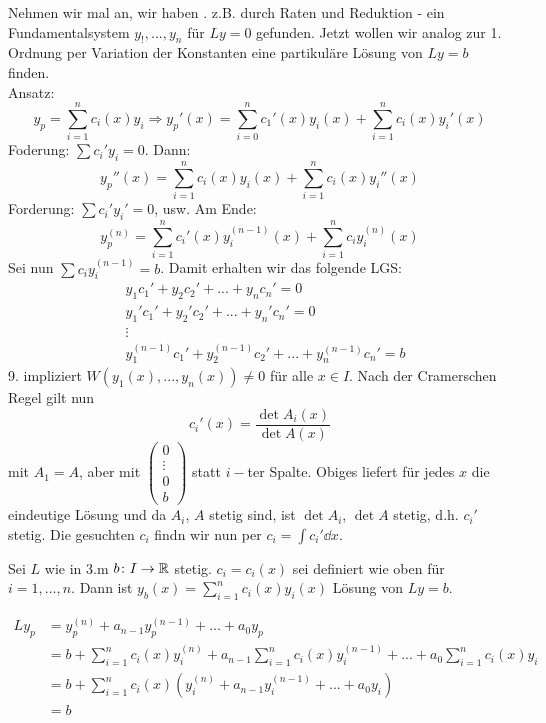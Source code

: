  Nehmen wir mal an, wir haben . z.B. durch Raten und Reduktion -  ein Fundamentalsystem $ y_!,...,y_n $ f\"ur $ Ly=0 $ gefunden. Jetzt wollen wir analog zur 1. Ordnung per Variation der Konstanten eine partikul\"are L\"osung von $ Ly=b $ finden.\\
 Ansatz:
 \[ y_p=\sum_{i=1}^{n}c_i(x)y_i\Rightarrow y_p'(x)=\sum_{i=0}^{n}c_1'(x)y_i(x)+\sum_{i=1}^{n}c_i(x)y_i'(x) \]
 Foderung: $ \sum c_i'y_i=0 $. Dann:
 \[ y_p''(x)=\sum_{i=1}^{n}c_i(x)y_i(x)+\sum_{i=1}^{n}c_i(x)y_i''(x) \]
 Forderung: $ \sum c_i'y_i'=0 $, usw.
 Am Ende:
 \[ y_p^{(n)}=\sum_{i=1}^{n}c_i'(x) y_i^{(n-1)}(x)+\sum_{i=1}^{n}c_i y_i^{(n)}(x) \]
 Sei nun $ \sum c_iy_i^{(n-1)}=b $. Damit erhalten wir das folgende LGS:
 \begin{align*}
 &y_1c_1'+y_2c_2'+...+y_nc_n'=0\\
 &y_1'c_1'+y_2'c_2'+...+y_n'c_n'=0\\
 &\vdots\\
 &y_1^{(n-1)}c_1'+y_2^{(n-1)}c_2'+...+y_n^{(n-1)}c_n'=b
 \end{align*}
 9. impliziert $ W(y_1(x),...,y_n(x))\neq 0 $ f\"ur alle $ x\in I $. Nach der Cramerschen Regel gilt nun
 \[ c_i'(x)=\frac{\det A_i(x)}{\det A(x)} \]
 mit $ A_1=A $, aber mit $ \begin{pmatrix}
 0\\\vdots\\0\\b
 \end{pmatrix} $ statt $ i- $ter Spalte. Obiges liefert f\"ur jedes $ x $ die eindeutige L\"osung und da $ A_i $, $ A $ stetig sind, ist $ \det A_i $, $ \det A $ stetig, d.h. $ c_i' $ stetig. Die gesuchten $ c_i $ findn wir nun per $ c_i=\int c_i'\dd x $.
 \begin{satz}
 	Sei $ L $ wie in 3.m $ b\colon I\rightarrow\mathbb{R} $ stetig. $ c_i=c_i(x) $ sei definiert wie oben f\"ur $ i=1,...,n $. Dann ist $ y_b(x)=\sum_{i=1}^{n}c_i(x) y_i(x) $ L\"osung von $ Ly=b $.
 \end{satz}
 \begin{beweis}
 	\begin{align*}
 	Ly_p&=y_p^{(n)}+a_{n-1}y_p^{(n-1)}+...+a_0y_p\\
 	&=b+\sum_{i=1}^{n}c_i(x) y_i^{(n)}+a_{n-1}\sum_{i=1}^{n}c_i(x)y_i^{(n-1)}+...+a_0\sum_{i=1}^{n}c_i(x)y_i\\
 	&=b+\sum_{i=1}^{n}c_i(x)\left(y_i^{(n)}+a_{n-1}y_i^{(n-1)}+...+a_0y_i\right)\\
 	&=b
 	\end{align*}
 \end{beweis}

